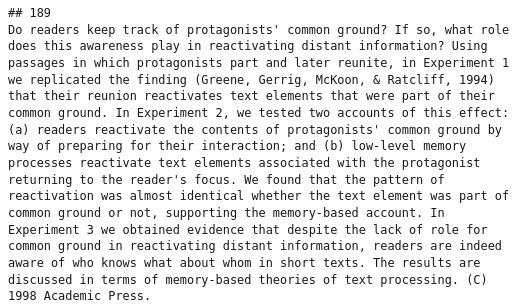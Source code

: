 \documentclass[
  english,
  man]{apa6}
\begin{document}
\begin{verbatim}
## 189                                                                                                                                                                                                                                                                                                                                                                                                                                                                                                                                                                                                                                                                                                                                                                                                                                                                                                                                                                                                                                                                                                                                                                                                                                                                                                                                                                                                                                                                                                                    Do readers keep track of protagonists' common ground? If so, what role does this awareness play in reactivating distant information? Using passages in which protagonists part and later reunite, in Experiment 1 we replicated the finding (Greene, Gerrig, McKoon, & Ratcliff, 1994) that their reunion reactivates text elements that were part of their common ground. In Experiment 2, we tested two accounts of this effect: (a) readers reactivate the contents of protagonists' common ground by way of preparing for their interaction; and (b) low-level memory processes reactivate text elements associated with the protagonist returning to the reader's focus. We found that the pattern of reactivation was almost identical whether the text element was part of common ground or not, supporting the memory-based account. In Experiment 3 we obtained evidence that despite the lack of role for common ground in reactivating distant information, readers are indeed aware of who knows what about whom in short texts. The results are discussed in terms of memory-based theories of text processing. (C) 1998 Academic Press.

\end{verbatim}
\end{document}
